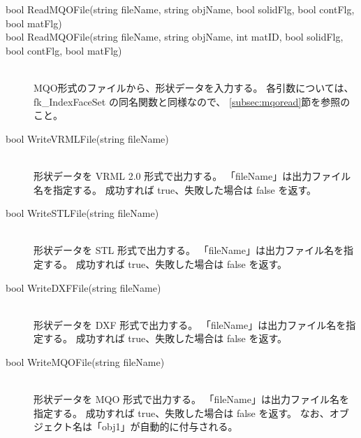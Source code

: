 \begin{description}
\item[bool ReadMQOFile(string fileName, string objName, bool solidFlg, bool contFlg, bool matFlg)]
\item[bool ReadMQOFile(string fileName, string objName, int matID, bool solidFlg, bool contFlg, bool matFlg)] ~ \\
	MQO形式のファイルから、形状データを入力する。
	各引数については、fk\_IndexFaceSet の同名関数と同様なので、
	\ref{subsec:mqoread}節を参照のこと。\\

\item[bool WriteVRMLFile(string fileName)] ~ \\
	形状データを VRML 2.0 形式で出力する。
	「fileName」は出力ファイル名を指定する。
	成功すれば true、失敗した場合は false を返す。\\

\item[bool WriteSTLFile(string fileName)] ~ \\
	形状データを STL 形式で出力する。
	「fileName」は出力ファイル名を指定する。
	成功すれば true、失敗した場合は false を返す。\\

\item[bool WriteDXFFile(string fileName)] ~ \\
	形状データを DXF 形式で出力する。
	「fileName」は出力ファイル名を指定する。
	成功すれば true、失敗した場合は false を返す。\\

\item[bool WriteMQOFile(string fileName)] ~ \\
	形状データを MQO 形式で出力する。
	「fileName」は出力ファイル名を指定する。
	成功すれば true、失敗した場合は false を返す。
	なお、オブジェクト名は「obj1」が自動的に付与される。		
\end{description}

